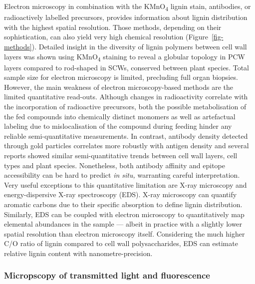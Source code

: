 \documentclass[journal=,manuscript=]{achemso}
\begin{document}
Electron microscopy in combination with the KMnO\textsubscript{4} lignin
stain, antibodies, or radioactively labelled precursors, provides
information about lignin distribution with the highest spatial
resolution. Those methods, depending on their sophistication, can also
yield very high chemical resolution (Figure~\ref{fig-methods}). Detailed
insight in the diversity of lignin polymers between cell wall layers was
shown using KMnO\textsubscript{4} staining to reveal a globular topology
in PCW layers compared to rod-shaped in SCWs, conserved between plant
species.\citep{Donaldson2001} Total sample size for electron microscopy
is limited, precluding full organ biopsies. However, the main weakness
of electron microscopy-based methods are the limited quantitative
read-outs. Although changes in radioactivity correlate with the
incorporation of radioactive precursors, both the possible
metabolisation of the fed compounds into chemically distinct monomers as
well as artefactual labeling due to mislocalisation of the compound
during feeding hinder any reliable semi-quantitative measurements. In
contrast, antibody density detected through gold particles correlates
more robustly with antigen density and several reports showed similar
semi-quantitative trends between cell wall layers, cell types and plant
species.\citep{Joseleau2004, Ruel2009} Nonetheless, both antibody
affinity and epitope accessibility can be hard to predict \emph{in
situ,} warranting careful interpretation. Very useful exceptions to this
quantitative limitation are X-ray microscopy and energy-dispersive X-ray
spectroscopy (EDS). X-ray microscopy can quantify aromatic carbons due
to their specific absorption to define lignin
distribution.\citep{Boyce2004} Similarly, EDS can be coupled with
electron microscopy to quantitatively map elemental abundances in the
sample --- albeit in practice with a slightly lower spatial resolution
than electron microscopy itself. Considering the much higher C/O ratio
of lignin compared to cell wall polysaccharides, EDS can estimate
relative lignin content with nanometre-precision.\citep{Menard2022}

\subsubsection{Micropscopy of transmitted light and
fluorescence}\label{micropscopy-of-transmitted-light-and-fluorescence}
\end{document}
